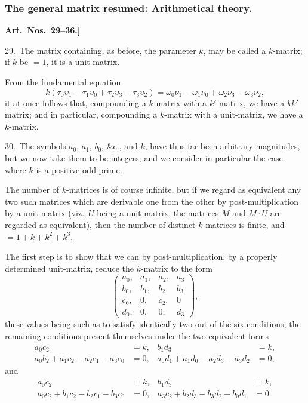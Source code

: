 \documentclass[11pt,a4paper]{book}
\begin{document}
\newpage

\subsubsection*{The general matrix resumed: Arithmetical theory.}

\textbf{Art.~Nos.~29--36.]
}

29.\ The matrix containing, as before, the parameter $k$, may be called a $k$-matrix; if $k$ be $= 1$, it is a unit-matrix.

From the fundamental equation
\[
k(\tau_0\upsilon_1 - \tau_1\upsilon_0 + \tau_2\upsilon_3 - \tau_3\upsilon_2) = \omega_0\nu_1 - \omega_1\nu_0 + \omega_2\nu_3 - \omega_3\nu_2,
\]
it at once follows that, compounding a $k$-matrix with a $k'$-matrix, we have a $kk'$-matrix; and in particular, compounding a $k$-matrix with a unit-matrix, we have a $k$-matrix.

\medskip

30.\ The symbols $a_0$, $a_1$, $b_0$, \&c., and $k$, have thus far been arbitrary magnitudes, but we now take them to be integers; and we consider in particular the case where $k$ is a positive odd prime.

The number of $k$-matrices is of course infinite, but if we regard as equivalent any two such matrices which are derivable one from the other by post-multiplication by a unit-matrix (viz.\ $U$ being a unit-matrix, the matrices $M$ and $M \cdot U$ are regarded as equivalent), then the number of distinct $k$-matrices is finite, and $= 1 + k + k^2 + k^3$.

The first step is to show that we can by post-multiplication, by a properly determined unit-matrix, reduce the $k$-matrix to the form
\[
\begin{pmatrix}
a_0, & a_1, & a_2, & a_3\\
b_0, & b_1, & b_2, & b_3\\
c_0, & 0, & c_2, & 0\\
d_0, & 0, & 0, & d_3
\end{pmatrix},
\]
these values being such as to satisfy identically two out of the six conditions; the remaining conditions present themselves under the two equivalent forms
\begin{align*}
a_0c_2 &= k, & b_1d_3 &= k,\\
a_0b_2 + a_1c_2 - a_2c_1 - a_3c_0 &= 0, & a_0d_1 + a_1d_0 - a_2d_3 - a_3d_2 &= 0,
\end{align*}
and
\begin{align*}
a_0c_2 &= k, & b_1d_3 &= k,\\
a_0c_2 + b_1c_2 - b_2c_1 - b_3c_0 &= 0, & a_3c_2 + b_2d_3 - b_3d_2 - b_0d_1 &= 0.
\end{align*}
\end{document}
